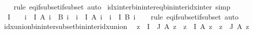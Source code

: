 \begin{isabellebody}
%
\isadelimproof
\ \ %
\endisadelimproof
%
\isatagproof
{}\isamarkupfalse%
\ {\isacharparenleft}{\kern0pt}rule\ eq{\isacharunderscore}{\kern0pt}if{\isacharunderscore}{\kern0pt}subset{\isacharunderscore}{\kern0pt}if{\isacharunderscore}{\kern0pt}subset{\isacharparenright}{\kern0pt}\ auto%
\endisatagproof
{\isafoldproof}%
%
\isadelimproof
\isanewline
%
\endisadelimproof
\isanewline
{}\isamarkupfalse%
\ idx{\isacharunderscore}{\kern0pt}inter{\isacharunderscore}{\kern0pt}bin{\isacharunderscore}{\kern0pt}inter{\isacharunderscore}{\kern0pt}eq{\isacharunderscore}{\kern0pt}bin{\isacharunderscore}{\kern0pt}inter{\isacharunderscore}{\kern0pt}idx{\isacharunderscore}{\kern0pt}inter\ {\isacharbrackleft}{\kern0pt}simp{\isacharbrackright}{\kern0pt}{\isacharcolon}{\kern0pt}\isanewline
\ \ {\isachardoublequoteopen}I\ {\isasymnoteq}\ {\isacharbraceleft}{\kern0pt}{\isacharbraceright}{\kern0pt}\ {\isasymLongrightarrow}\ {\isacharparenleft}{\kern0pt}{\isasymInter}i\ {\isasymin}\ I{\isachardot}{\kern0pt}\ A\ i\ {\isasyminter}\ B\ i{\isacharparenright}{\kern0pt}\ {\isacharequal}{\kern0pt}\ {\isacharparenleft}{\kern0pt}{\isasymInter}i\ {\isasymin}\ I{\isachardot}{\kern0pt}\ A\ i{\isacharparenright}{\kern0pt}\ {\isasyminter}\ {\isacharparenleft}{\kern0pt}{\isasymInter}i\ {\isasymin}\ I{\isachardot}{\kern0pt}\ B\ i{\isacharparenright}{\kern0pt}{\isachardoublequoteclose}\isanewline
%
\isadelimproof
\ \ %
\endisadelimproof
%
\isatagproof
{}\isamarkupfalse%
\ {\isacharparenleft}{\kern0pt}rule\ eq{\isacharunderscore}{\kern0pt}if{\isacharunderscore}{\kern0pt}subset{\isacharunderscore}{\kern0pt}if{\isacharunderscore}{\kern0pt}subset{\isacharparenright}{\kern0pt}\ auto%
\endisatagproof
{\isafoldproof}%
%
\isadelimproof
\isanewline
%
\endisadelimproof
\isanewline
{}\isamarkupfalse%
\ idx{\isacharunderscore}{\kern0pt}union{\isacharunderscore}{\kern0pt}bin{\isacharunderscore}{\kern0pt}inter{\isacharunderscore}{\kern0pt}subset{\isacharunderscore}{\kern0pt}bin{\isacharunderscore}{\kern0pt}inter{\isacharunderscore}{\kern0pt}idx{\isacharunderscore}{\kern0pt}union{\isacharcolon}{\kern0pt}\isanewline
\ \ {\isachardoublequoteopen}{\isacharparenleft}{\kern0pt}{\isasymUnion}z\ {\isasymin}\ I\ {\isasyminter}\ J{\isachardot}{\kern0pt}\ A\ z{\isacharparenright}{\kern0pt}\ {\isasymsubseteq}\ {\isacharparenleft}{\kern0pt}{\isasymUnion}z\ {\isasymin}\ I{\isachardot}{\kern0pt}\ A\ z{\isacharparenright}{\kern0pt}\ {\isasyminter}\ {\isacharparenleft}{\kern0pt}{\isasymUnion}z\ {\isasymin}\ J{\isachardot}{\kern0pt}\ A\ z{\isacharparenright}{\kern0pt}{\isachardoublequoteclose}\isanewline

\end{isabellebody}
